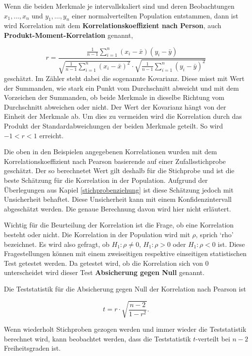 \documentclass[
]{book}
\theoremstyle{definition}
\theoremstyle{definition}
\theoremstyle{definition}
\theoremstyle{definition}
\theoremstyle{remark}
\begin{document}
Wenn die beiden Merkmale je intervallskaliert sind und deren Beobachtungen \(x_1, \ldots, x_n\) und \(y_1,\ldots, y_n\) einer normalverteilten Population entstammen, dann ist wird Korrelation mit dem \label{customdef-pearson-korrelation}{\textbf{Korrelationskoeffizient nach Person}}, auch \label{customdef-podukt-moment-korrelation}{\textbf{Produkt-Moment-Korrelation}} genannt,

\[
r = \frac{\frac{1}{n-1} \sum_{i=1}^n (x_i - \bar{x})(y_i - \bar{y})}{\sqrt{\frac{1}{n-1}\sum_{i=1}^n (x_i - \bar{x})^2}\cdot \sqrt{\frac{1}{n-1}\sum_{i=1}^n (y_i - \bar{y})^2}}
\]
geschätzt. Im Zähler steht dabei die sogenannte Kovarianz. Diese misst mit Wert der Summanden, wie stark ein Punkt vom Durchschnitt abweicht und mit dem Vorzeichen der Summanden, ob beide Merkmale in dieselbe Richtung vom Durchschnitt abweichen oder nicht. Der Wert der Kovarianz hängt von der Einheit der Merkmale ab. Um dies zu vermeiden wird die Korrelation durch das Produkt der Standardabweichungen der beiden Merkmale geteilt. So wird \(-1<r<1\) erreicht.

Die oben in den Beispielen angegebenen Korrelationen wurden mit dem Korrelationskoeffizient nach Pearson basierende auf einer Zufallsstichprobe geschätzt. Der so berechnetet Wert gilt deshalb für die Stichprobe und ist die beste Schätzung für die Korrelation in der Population. Aufgrund der Überlegungen aus Kapiel \ref{stichprobenziehung} ist diese Schätzung jedoch mit Unsicherheit behaftet. Diese Unsicherheit kann mit einem Konfidenzintervall abgeschätzt werden. Die genaue Berechnung davon wird hier nicht erläutert.

Wichtig für die Beurteilung der Korrelation ist die Frage, ob eine Korrelation besteht oder nicht. Die Korrelation in der Population wird mit \(\rho\), sprich `rho' bezeichnet. Es wird also gefragt, ob \(H_1: \rho \neq 0\), \(H_1: \rho > 0\) oder \(H_1: \rho < 0\) ist. Diese Fragestellungen können mit einem zweiseitigen respektive einseitigen statistischen Test getestet werden. Da getestet wird, ob die Korrelation sich von \(0\) unterscheidet wird dieser Test \label{customdef-podukt-moment-absichern-null}{\textbf{Absicherung gegen Null}} genannt.

Die Teststatistik für die Absicherung gegen Null der Korrelation nach Pearson ist

\[t = r\cdot \sqrt{\frac{n-2}{1-r^2}}. \]

Wenn wiederholt Stichproben gezogen werden und immer wieder die Teststatistik berechnet wird, kann beobachtet werden, dass die Teststatistik \(t\)-verteilt bei \(n-2\) Freiheitsgraden ist.
\end{document}
